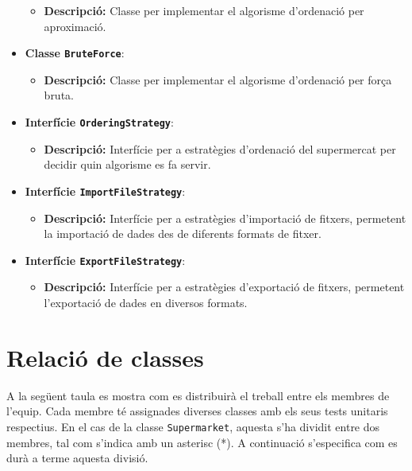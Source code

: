 \documentclass[a4paper,12pt]{report}
\begin{document}
\begin{itemize}
		\begin{itemize}
			\item \textbf{Descripció:} Classe per implementar el algorisme d'ordenació per aproximació.
		\end{itemize}
		\item \textbf{Classe \texttt{BruteForce}}:
		\begin{itemize}
			\item \textbf{Descripció:} Classe per implementar el algorisme d'ordenació per força bruta.
		\end{itemize}
		\item \textbf{Interfície \texttt{OrderingStrategy}}:
		\begin{itemize}
			\item \textbf{Descripció:} Interfície per a estratègies d'ordenació del supermercat per decidir quin algorisme es fa servir.
		\end{itemize}
		\item \textbf{Interfície \texttt{ImportFileStrategy}}:
		\begin{itemize}
			\item \textbf{Descripció:} Interfície per a estratègies d'importació de fitxers, permetent la importació de dades des de diferents formats de fitxer.
		\end{itemize}
		\item \textbf{Interfície \texttt{ExportFileStrategy}}:
		\begin{itemize}
			\item \textbf{Descripció:} Interfície per a estratègies d'exportació de fitxers, permetent l'exportació de dades en diversos formats.
		\end{itemize}
	\end{itemize}
	
	\section{Relació de classes}
	
	A la següent taula es mostra com es distribuirà el treball entre els membres de l’equip. Cada membre té assignades diverses classes amb els seus tests unitaris respectius. En el cas de la classe \texttt{Supermarket}, aquesta s’ha dividit entre dos membres, tal com s’indica amb un asterisc (*). A continuació s’especifica com es durà a terme aquesta divisió.
	
\end{document}
